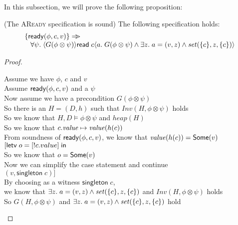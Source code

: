In this subsection, we will prove the following proposition: 

\begin{prop*}{(The \textsc{AReady} specification is sound)}
The following specification holds: 
\begin{displaymath}
\begin{array}{l}
\{{\mathsf{ready}({\phi}, {c}, {v})}\} \Rightarrow\!\!\!> \\
\;\;\;\forall \psi.\; \langle{G(\phi \otimes \psi)}\rangle{\mathsf{read}\;c}\langle{a}.\;{G(\phi \otimes \psi) \land \exists z.\;a = (v, z) \land \mathit{set}(\{{c}\}, z, \{{c}\})}\rangle 
\end{array}
\end{displaymath}
\end{prop*}

\begin{proof}
\begin{tabbedproof}
\oo Assume we have $\phi$, $c$ and $v$ \\ 
\oo Assume $\mathsf{ready}({\phi}, {c}, {v})$ and a $\psi$ \\
\ooo Now assume we have a precondition $G(\phi \otimes \psi)$ \\
\ooo So there is an $H = (D,h)$ such that $\mathit{Inv}(H, \phi \otimes \psi)$ holds \\
\ooo So we know that $H, D \models \phi \otimes \psi$ and $\mathit{heap}(H)$ \\
\ooo So we know that $c.\mathit{value} \mapsto \mathit{value}(h(c))$ \\
\ooo From soundness of $\mathsf{ready}({\phi}, {c}, {v})$, we know that $\mathit{value}(h(c)) = \mathsf{Some}(v)$ \\
\ooo $[\mathsf{letv}\;o = [!c.value]\;\mathsf{in}\;$ \\
\ooo So we know that $o = \mathsf{Some}(v)$ \\
\ooo Now we can simplify the case statement and continue \\
\ooo $(v, \mathsf{singleton}\;c)]$ \\
\ooo By choosing as a witness $\mathsf{singleton}\;c$, \\
\ooo we know that $\exists z.\;a = (v, z) \land \mathit{set}(\{{c}\}, z, \{{c}\})$ and $\mathit{Inv}(H, \phi \otimes \psi)$ holds \\
\ooo So $G(H, \phi \otimes \psi)$ and $\exists z.\;a = (v, z) \land \mathit{set}(\{{c}\}, z, \{{c}\})$ hold
\end{tabbedproof}
\end{proof}

